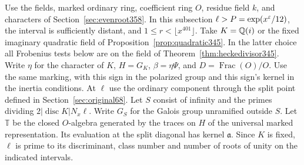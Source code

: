 \documentclass[a4paper,11pt]{article}
\theoremstyle{definition}
\theoremstyle{remark}
\numberwithin{equation}{section}
\begin{document}
Use the fields, marked ordinary ring, coefficient ring \(O\), residue
field \(k\), and characters of Section~\ref{sec:evenroot358}. In this
subsection \(\ell>P=\exp(x^\varepsilon/12)\), the interval is sufficiently
distant, and \(1\le r<\lfloor x^{401}\rfloor\). Take \(K=\mathbb Q(i)\)
or the fixed imaginary quadratic field of
Proposition~\ref{prop:quadratic345}. In the latter choice all
Frobenius tests below are on the field of
Theorem~\ref{thm:heckedivisor345}. Write \(\eta\) for the
character of \(K\), \(H=G_K\), \(\beta=\eta\Psi\), and
\(D=\operatorname{Frac}(O)/O\). Use the same marking, with
this sign in the polarized group and this sign's kernel in the
inertia conditions. At \(\ell\) use the ordinary component through
the split point defined in Section~\ref{sec:original68}.
Let \(S\) consist of infinity and the primes dividing
\(2|\operatorname{disc} K|N_x\ell\).
Write \(G_S\) for the Galois group unramified outside \(S\).
Let \(\mathbb T\) be the closed \(O\)-algebra generated by the
traces on \(H\) of the universal marked representation. Its evaluation
at the split diagonal has kernel \(\mathfrak a\). Since \(K\)
is fixed, \(\ell\) is prime to its discriminant, class number
and number of roots of unity on the indicated intervals.
\end{document}
